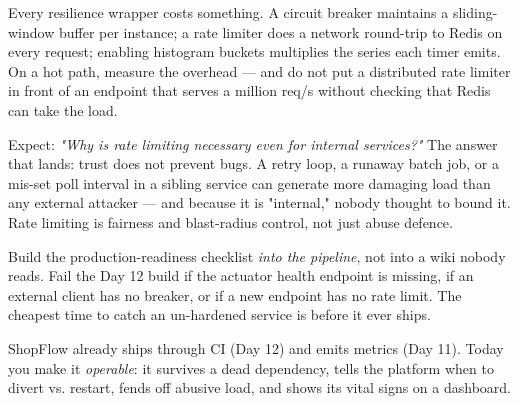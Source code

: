 \begin{perfnote}
Every resilience wrapper costs something. A circuit breaker maintains a sliding-window buffer per instance; a rate limiter does a network round-trip to Redis on every request; enabling histogram buckets multiplies the series each timer emits. On a hot path, measure the overhead --- and do not put a distributed rate limiter in front of an endpoint that serves a million req/s without checking that Redis can take the load.
\end{perfnote}

\begin{interview}
Expect: \emph{"Why is rate limiting necessary even for internal services?"} The answer that lands: trust does not prevent bugs. A retry loop, a runaway batch job, or a mis-set poll interval in a sibling service can generate more damaging load than any external attacker --- and because it is "internal," nobody thought to bound it. Rate limiting is fairness and blast-radius control, not just abuse defence.
\end{interview}

\begin{prodtip}
Build the production-readiness checklist \emph{into the pipeline}, not into a wiki nobody reads. Fail the Day 12 build if the actuator health endpoint is missing, if an external client has no breaker, or if a new endpoint has no rate limit. The cheapest time to catch an un-hardened service is before it ever ships.
\end{prodtip}


ShopFlow already ships through CI (Day 12) and emits metrics (Day 11). Today you make it \emph{operable}: it survives a dead dependency, tells the platform when to divert vs. restart, fends off abusive load, and shows its vital signs on a dashboard.

